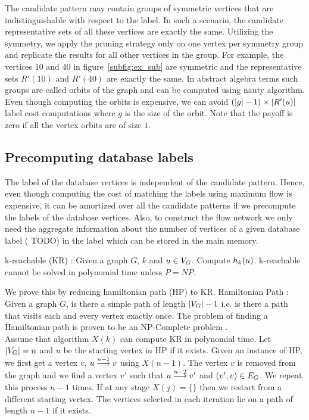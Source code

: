  The candidate pattern may contain groups of symmetric
vertices that are indistinguishable with respect to the \khop label. In such a scenario, 
the candidate representative sets of all these vertices are exactly the same. Utilizing the
symmetry, we apply the pruning strategy only on one vertex per symmetry group and 
replicate the results for all other vertices in the group. For example, the
vertices $10$ and $40$ in figure~\ref{subfig:ex_sub} are symmetric and
the representative sets $R'(10)$ and $R'(40)$ are exactly the same.
In abstract algebra terms such  
groups are called orbits of the graph and can be computed using nauty algorithm. Even though
computing the orbits is expensive, we can avoid $ (|g|-1) \times |\CR|$ \khop label cost computations
where $g$ is the size of the orbit. Note that the payoff is zero if all the vertex orbits are of
size $1$.

\subsection{Precomputing database \khop labels}
The \khop label of the database vertices is independent of the candidate pattern. Hence, even though
computing the cost of matching the \khop labels using maximum flow is expensive, it
can be amortized over all the candidate patterns  if we precompute the \khop labels of the
database vertices. Also, to construct the flow network we only need the aggregate information
about the number of vertices of a given database label ( TODO) 
in the \khop label which can be stored in the main memory. 

\begin{thm}
k-reachable (KR) : Given a graph $G$, $k$ and $u \in \vg$. Compute $\khopl{k}{u}$.
k-reachable cannot be solved in polynomial time unless $P = NP$.

\begin{myproof}
We prove this by reducing hamiltonian path (HP) to KR.
Hamiltonian Path : Given a graph $G$, is there a simple path of length
$|\vg|-1$ i.e. is there a path that visits each and every vertex exactly
once. The problem of finding a Hamiltonian path is proven to be an NP-Complete
problem \cite{npcomplete}.\\
Assume that algorithm $X(k)$ can compute KR in polynomial time. Let $|\vg| = n$ 
and $u$ be the starting vertex in HP if it exists.
Given an instance of HP, we first get a vertex $v$, $\kpath{u}{v}{n-1}$ using
$X(n-1)$. The vertex $v$ is removed from the graph and we find a vertex $v'$
such that $\kpath{u}{v'}{n-2}$ and $(v', v) \in \eg$. We repeat this process
$n-1$ times. If at any stage $X(j) = \{\}$ then we restart from a different starting
vertex. The vertices selected in each iteration lie on a path of length $n-1$ if it exists.
\end{myproof}
\end{thm}

